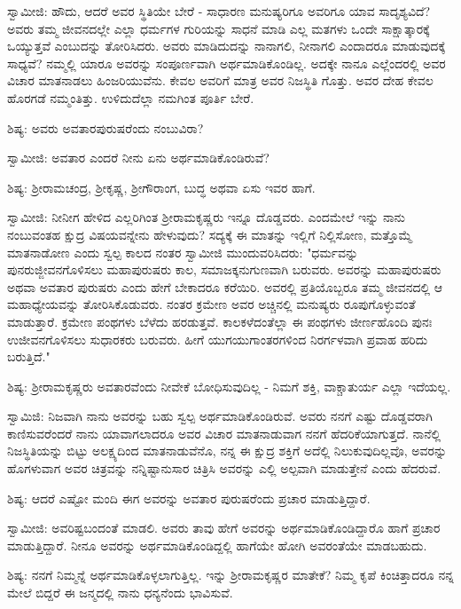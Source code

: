 ಸ್ವಾಮೀಜಿ: ಹೌದು, ಆದರೆ ಅವರ ಸ್ಥಿತಿಯೇ ಬೇರೆ - ಸಾಧಾರಣ ಮನುಷ್ಯರಿಗೂ ಅವರಿಗೂ ಯಾವ ಸಾದೃಶ್ಯವಿದೆ? ಅವರು ತಮ್ಮ ಜೀವನದಲ್ಲೇ ಎಲ್ಲಾ ಧರ್ಮಗಳ ಗುರಿಯನ್ನು ಸಾಧನೆ ಮಾಡಿ ಎಲ್ಲ ಮತಗಳು ಒಂದೇ ಸಾಕ್ಷಾತ್ಕಾರಕ್ಕೆ ಒಯ್ಯುತ್ತವೆ ಎಂಬುದನ್ನು ತೋರಿಸಿದರು. ಅವರು ಮಾಡಿದುದನ್ನು ನಾನಾಗಲಿ, ನೀನಾಗಲಿ ಎಂದಾದರೂ ಮಾಡುವುದಕ್ಕೆ ಸಾಧ್ಯವೆ? ನಮ್ಮಲ್ಲಿ ಯಾರೂ ಅವರನ್ನು ಸಂಪೂರ್ಣವಾಗಿ ಅರ್ಥಮಾಡಿಕೊಂಡಿಲ್ಲ. ಅದಕ್ಕೇ ನಾನೂ ಎಲ್ಲೆಂದರಲ್ಲಿ ಅವರ ವಿಚಾರ ಮಾತನಾಡಲು ಹಿಂಜರಿಯುವೆನು. ಕೇವಲ ಅವರಿಗೆ ಮಾತ್ರ ಅವರ ನಿಜಸ್ಥಿತಿ ಗೊತ್ತು. ಅವರ ದೇಹ ಕೇವಲ ಹೊರಗಡೆ ನಮ್ಮಂತಿತ್ತು. ಉಳಿದುದೆಲ್ಲಾ ನಮಗಿಂತ ಪೂರ್ತಿ ಬೇರೆ.

ಶಿಷ್ಯ: ಅವರು ಅವತಾರಪುರುಷರೆಂದು ನಂಬುವಿರಾ?

ಸ್ವಾಮೀಜಿ: ಅವತಾರ ಎಂದರೆ ನೀನು ಏನು ಅರ್ಥಮಾಡಿಕೊಂಡಿರುವೆ?

ಶಿಷ್ಯ: ಶ‍್ರೀರಾಮಚಂದ್ರ, ಶ‍್ರೀಕೃಷ್ಣ, ಶ‍್ರೀಗೌರಾಂಗ, ಬುದ್ಧ ಅಥವಾ ಏಸು ಇವರ ಹಾಗೆ.

ಸ್ವಾಮೀಜಿ: ನೀನೀಗ ಹೇಳಿದ ಎಲ್ಲರಿಗಿಂತ ಶ‍್ರೀರಾಮಕೃಷ್ಣರು ಇನ್ನೂ ದೊಡ್ಡವರು. ಎಂದಮೇಲೆ ಇನ್ನು ನಾನು ನಂಬುವಂತಹ ಕ್ಷುದ್ರ ವಿಷಯವನ್ನೇನು ಹೇಳುವುದು? ಸದ್ಯಕ್ಕೆ ಈ ಮಾತನ್ನು ಇಲ್ಲಿಗೆ ನಿಲ್ಲಿಸೋಣ, ಮತ್ತೊಮ್ಮೆ ಮಾತನಾಡೋಣ ಎಂದು ಸ್ವಲ್ಪ ಕಾಲದ ನಂತರ ಸ್ವಾಮೀಜಿ ಮುಂದುವರಿಸಿದರು: "ಧರ್ಮವನ್ನು ಪುನರುಜ್ಜೀವನಗೊಳಿಸಲು ಮಹಾಪುರುಷರು ಕಾಲ, ಸಮಾಜಕ್ಕನುಗುಣವಾಗಿ ಬರುವರು. ಅವರನ್ನು ಮಹಾಪುರುಷರು ಅಥವಾ ಅವತಾರ ಪುರುಷರು ಎಂದು ಹೇಗೆ ಬೇಕಾದರೂ ಕರೆಯಿರಿ. ಅವರಲ್ಲಿ ಪ್ರತಿಯೊಬ್ಬರೂ ತಮ್ಮ ಜೀವನದಲ್ಲಿ ಆ ಮಹಾಧ್ಯೇಯವನ್ನು ತೋರಿಸಿಕೊಡುವರು. ನಂತರ ಕ್ರಮೇಣ ಅವರ ಅಚ್ಚಿನಲ್ಲಿ ಮನುಷ್ಯರು ರೂಪುಗೊಳ್ಳುವಂತೆ ಮಾಡುತ್ತಾರೆ. ಕ್ರಮೇಣ ಪಂಥಗಳು ಬೆಳೆದು ಹರಡುತ್ತವೆ. ಕಾಲಕಳೆದಂತೆಲ್ಲಾ ಈ ಪಂಥಗಳು ಜೀರ್ಣಹೊಂದಿ ಪುನಃ ಉಜೀವನಗೊಳಿಸಲು ಸುಧಾರಕರು ಬರುವರು. ಹೀಗೆ ಯುಗಯುಗಾಂತರಗಳಿಂದ ನಿರರ್ಗಳವಾಗಿ ಪ್ರವಾಹ ಹರಿದು ಬರುತ್ತಿದೆ."

ಶಿಷ್ಯ: ಶ‍್ರೀರಾಮಕೃಷ್ಣರು ಅವತಾರವೆಂದು ನೀವೇಕೆ ಬೋಧಿಸುವುದಿಲ್ಲ - ನಿಮಗೆ ಶಕ್ತಿ, ವಾಕ್ಚಾತುರ್ಯ ಎಲ್ಲಾ ಇದೆಯಲ್ಲ.

ಸ್ವಾಮಿಜಿ: ನಿಜವಾಗಿ ನಾನು ಅವರನ್ನು ಬಹು ಸ್ವಲ್ಪ ಅರ್ಥಮಾಡಿಕೊಂಡಿರುವೆ. ಅವರು ನನಗೆ ಎಷ್ಟು ದೊಡ್ಡವರಾಗಿ ಕಾಣಿಸುವರೆಂದರೆ ನಾನು ಯಾವಾಗಲಾದರೂ ಅವರ ವಿಚಾರ ಮಾತನಾಡುವಾಗ ನನಗೆ ಹೆದರಿಕೆಯಾಗುತ್ತದೆ. ನಾನೆಲ್ಲಿ ನಿಜಸ್ಥಿತಿಯನ್ನು ಬಿಟ್ಟು ಅಲಕ್ಷ್ಯದಿಂದ ಮಾತನಾಡುವೆನೊ, ನನ್ನ ಈ ಕ್ಷುದ್ರ ಶಕ್ತಿಗೆ ಅದೆಲ್ಲಿ ನಿಲುಕುವುದಿಲ್ಲವೊ, ಅವರನ್ನು ಹೊಗಳುವಾಗ ಅವರ ಚಿತ್ರವನ್ನು ನನ್ನಿಷ್ಟಾನುಸಾರ ಚಿತ್ರಿಸಿ ಅವರನ್ನು ಎಲ್ಲಿ ಅಲ್ಪವಾಗಿ ಮಾಡುತ್ತೇನೆ ಎಂದು ಹೆದರುವೆ.

ಶಿಷ್ಯ: ಆದರೆ ಎಷ್ಟೋ ಮಂದಿ ಈಗ ಅವರನ್ನು ಅವತಾರ ಪುರುಷರೆಂದು ಪ್ರಚಾರ ಮಾಡುತ್ತಿದ್ದಾರೆ.

ಸ್ವಾಮೀಜಿ: ಅವರಿಷ್ಟಬಂದಂತೆ ಮಾಡಲಿ. ಅವರು ತಾವು ಹೇಗೆ ಅವರನ್ನು ಅರ್ಥಮಾಡಿಕೊಂಡಿದ್ದಾರೊ ಹಾಗೆ ಪ್ರಚಾರ ಮಾಡುತ್ತಿದ್ದಾರೆ. ನೀನೂ ಅವರನ್ನು ಅರ್ಥಮಾಡಿಕೊಂಡಿದ್ದಲ್ಲಿ ಹಾಗೆಯೇ ಹೋಗಿ ಅವರಂತೆಯೇ ಮಾಡಬಹುದು.

ಶಿಷ್ಯ: ನನಗೆ ನಿಮ್ಮನ್ನೆ ಅರ್ಥಮಾಡಿಕೊಳ್ಳಲಾಗುತ್ತಿಲ್ಲ. ಇನ್ನು ಶ‍್ರೀರಾಮಕೃಷ್ಣರ ಮಾತೇಕೆ? ನಿಮ್ಮ ಕೃಪೆ ಕಿಂಚಿತ್ತಾದರೂ ನನ್ನ ಮೇಲೆ ಬಿದ್ದರೆ ಈ ಜನ್ಮದಲ್ಲಿ ನಾನು ಧನ್ಯನೆಂದು ಭಾವಿಸುವೆ.

\newpage

